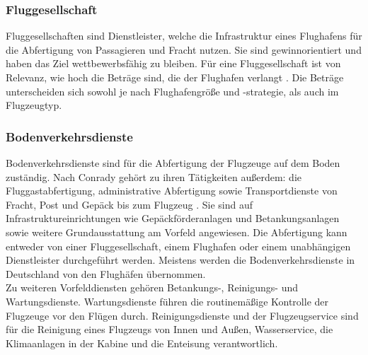 \subsubsection{Fluggesellschaft}
Fluggesellschaften sind Dienstleister, welche die Infrastruktur eines Flughafens für die 
Abfertigung von Passagieren und Fracht nutzen. 
Sie sind gewinnorientiert und haben das Ziel wettbewerbsfähig zu bleiben. 
Für eine Fluggesellschaft ist von Relevanz, wie hoch die Beträge
sind, die der Flughafen verlangt \cite{schaar2010analysis}. 
Die Beträge unterscheiden sich sowohl je nach Flughafengröße und -strategie, als auch im Flugzeugtyp.

\subsubsection{Bodenverkehrsdienste} %
%
Bodenverkehrsdienste sind für die Abfertigung der Flugzeuge auf dem Boden zuständig.
Nach Conrady \cite{conrady2019luftverkehr} gehört zu ihren Tätigkeiten außerdem:  
die Fluggastabfertigung, administrative Abfertigung sowie Transportdienste von Fracht, Post und Gepäck bis zum Flugzeug \cite{mensen2013handbuch}.
Sie sind auf Infrastruktureinrichtungen wie Gepäckförderanlagen und Betankungsanlagen 
sowie weitere Grundausstattung am Vorfeld angewiesen. 
Die Abfertigung kann entweder von einer Fluggesellschaft, einem Flughafen oder einem 
unabhängigen Dienstleister durchgeführt werden. 
Meistens werden die Bodenverkehrsdienste in Deutschland von den Flughäfen übernommen.\\ %
%
Zu weiteren Vorfelddiensten gehören Betankungs-, Reinigungs- und Wartungsdienste.
Wartungsdienste führen die routinemäßige Kontrolle der Flugzeuge vor den Flügen durch.
Reinigungsdienste und der Flugzeugservice sind für die Reinigung eines Flugzeugs 
von Innen und Außen, Wasserservice, die Klimaanlagen in der Kabine und die Enteisung verantwortlich.
%
%
%
